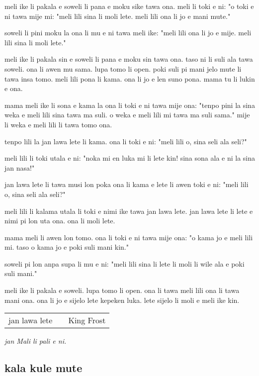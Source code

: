 meli ike li pakala e soweli li pana e moku sike tawa ona. 
meli li toki e ni: 
"o toki e ni tawa mije mi: 
"meli lili sina li moli lete. 
meli lili ona li jo e mani mute."

soweli li pini moku la ona li mu e ni tawa meli ike: 
"meli lili ona li jo e mije. 
meli lili sina li moli lete."

meli ike li pakala sin e soweli li pana e moku sin tawa ona. 
taso ni li suli ala tawa soweli. 
ona li awen mu sama. 
lupa tomo li open. 
poki suli pi mani jelo mute li tawa insa tomo. 
meli lili pona li kama. 
ona li jo e len suno pona. 
mama tu li lukin e ona.

mama meli ike li sona e kama la ona li toki e ni tawa mije ona: 
"tenpo pini la sina weka e meli lili sina tawa ma suli. 
o weka e meli lili mi tawa ma suli sama." 
mije li weka e meli lili li tawa tomo ona.

tenpo lili la jan lawa lete li kama. 
ona li toki e ni: 
"meli lili o, sina seli ala seli?"

meli lili li toki utala e ni: 
"noka mi en luka mi li lete kin! 
sina sona ala e ni la sina jan nasa!"

jan lawa lete li tawa musi lon poka ona li kama e lete li awen toki e ni: 
"meli lili o, sina seli ala seli?"

meli lili li kalama utala li toki e nimi ike tawa jan lawa lete. 
jan lawa lete li lete e nimi pi lon uta ona. 
ona li moli lete.

mama meli li awen lon tomo. 
ona li toki e ni tawa mije ona: 
"o kama jo e meli lili mi. 
taso o kama jo e poki suli mani kin."

soweli pi lon anpa supa li mu e ni: 
"meli lili sina li lete li moli li wile ala e poki suli mani."

meli ike li pakala e soweli. 
lupa tomo li open. 
ona li tawa meli lili ona li tawa mani ona. 
ona li jo e sijelo lete kepeken luka. 
lete sijelo li moli e meli ike kin.

\begin{supertabular}{p{5,5cm}|ll}
jan lawa lete  && King Frost  \\
\end{supertabular}

\textit{jan Mali li pali e ni. \cite{www:astrodonunt:01}}
%
\subsection{kala kule mute}

